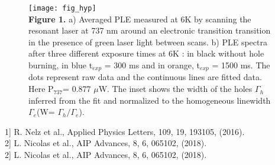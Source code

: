 \documentclass[a4paper,11pt]{article}
\begin{document}


\hspace{10pt}
\begin{figure}[h!]\centering
\texttt{[image: fig\_hyp]}\\
\noindent\textbf{Figure 1.} a) Averaged PLE measured at 6K by scanning the resonant laser at 737 nm around an electronic transition transition in the presence of green laser light between scans. b) PLE spectra after three different exposure times at 6K : in black without hole burning, in blue t$_{exp}$ = 300 ms and in orange, t$_{exp}$ = 1500 ms. The dots represent raw data and the continuous lines are fitted data. Here P$_{737}$= 0.877 $\mu$W. The inset shows the width of the holes $\Gamma_h$ inferred from the fit and normalized to the homogeneous linewidth $\Gamma_e$(W= $\Gamma_h/\Gamma_e$).
\end{figure}

%

\hspace{10pt}

\noindent{[}1{]} R. Nelz et al., Applied Physics Letters, 109, 19, 193105, (2016).\\
\noindent{[}2{]} L. Nicolas et al., AIP Advances, 8, 6, 065102, (2018).\\
\noindent{[}2{]} L. Nicolas et al., AIP Advances, 8, 6, 065102, (2018).\\
\end{document}

